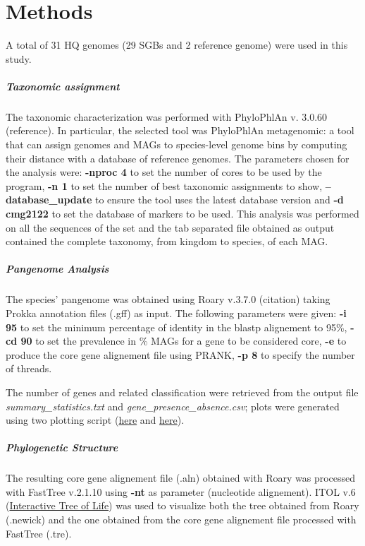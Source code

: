\section*{Methods}



A total of 31 HQ genomes (29 SGBs and 2 reference genome) were used in this study.

\nocite{Tange2011a}

\subparagraph*{Taxonomic assignment}

The taxonomic characterization was performed with PhyloPhlAn v. 3.0.60 (reference). In particular, the selected tool was PhyloPhlAn metagenomic: a tool that can assign genomes and MAGs to species-level genome bins by computing their distance with a database of reference genomes. The parameters chosen for the analysis were: \textbf{-nproc 4} to set the number of cores to be used by the program, \textbf{-n 1} to set the number of best taxonomic assignments to show, \textbf{--database_update} to ensure the tool uses the latest database version and \textbf{-d cmg2122} to set the database of markers to be used. This analysis was performed on all the sequences of the set and the tab separated file obtained as output contained the complete taxonomy, from kingdom to species, of each MAG.


\subparagraph*{Pangenome Analysis}

The species' pangenome was obtained using Roary v.3.7.0 (citation) taking Prokka annotation files (.gff) as input. 
The following parameters were given: \textbf{-i 95} to set the minimum percentage of identity
in the blastp alignement to 95\%, \textbf{-cd 90} to set the prevalence in \% MAGs for a gene
to be considered core, \textbf{-e} to produce the core gene alignement file using PRANK, \textbf{-p 8} to
specify the number of threads. 

The number of genes and related classification were retrieved from the output file
\textit{summary\_statistics.txt} and \textit{gene\_presence\_absence.csv}; plots were generated using two
plotting script (\href{https://github.com/sanger-pathogens/Roary/blob/master/bin/create_pan_genome_plots.R}{here}
and \href{https://github.com/sanger-pathogens/Roary/blob/master/contrib/roary_plots/roary_plots.py}{here}).


\subparagraph*{Phylogenetic Structure}

The resulting core gene alignement file (.aln) obtained with Roary was processed with FastTree v.2.1.10
using \textbf{-nt} as parameter (nucleotide alignement). ITOL v.6 (\href{https://itol.embl.de/}{Interactive Tree of Life})
was used to visualize both the tree obtained from Roary (.newick) and the one obtained from the core
gene alignement file processed with FastTree (.tre).




